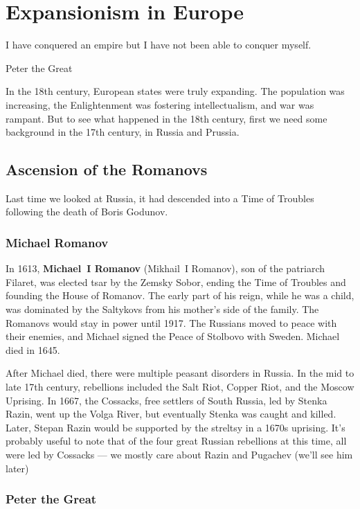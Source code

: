 \chapter{Expansionism in Europe}

\epigraph{%
  I have conquered an empire but I have not been able to conquer myself.
}{Peter the Great}

In the 18th century, European states were truly expanding.
The population was increasing, the Enlightenment was fostering intellectualism, and war was rampant.
But to see what happened in the 18th century, first we need some background in the 17th century,
in Russia and Prussia.

\section{Ascension of the Romanovs}

Last time we looked at Russia, it had descended into a Time of Troubles following the death of Boris Godunov.

\subsection*{Michael Romanov}

In 1613, \textbf{Michael~I Romanov} (Mikhail~I Romanov), son of the patriarch Filaret,
was elected tsar by the Zemsky Sobor,
ending the Time of Troubles and founding the House of Romanov.
The early part of his reign, while he was a child,
was dominated by the Saltykovs from his mother's side of the family.
The Romanovs would stay in power until 1917.
The Russians moved to peace with their enemies, and Michael signed the Peace of Stolbovo with Sweden.
Michael died in 1645.

After Michael died, there were multiple peasant disorders in Russia.
In the mid to late 17th century, rebellions included the
Salt Riot, Copper Riot, and the Moscow Uprising.
In 1667, the Cossacks, free settlers of South Russia, led by Stenka Razin,
went up the Volga River, but eventually Stenka was caught and killed.
Later, Stepan Razin would be supported by the streltsy in a 1670s uprising.
It's probably useful to note that of the four great Russian rebellions at this time,
all were led by Cossacks --- we mostly care about Razin and Pugachev (we'll see him later)

\subsection*{Peter the Great}

